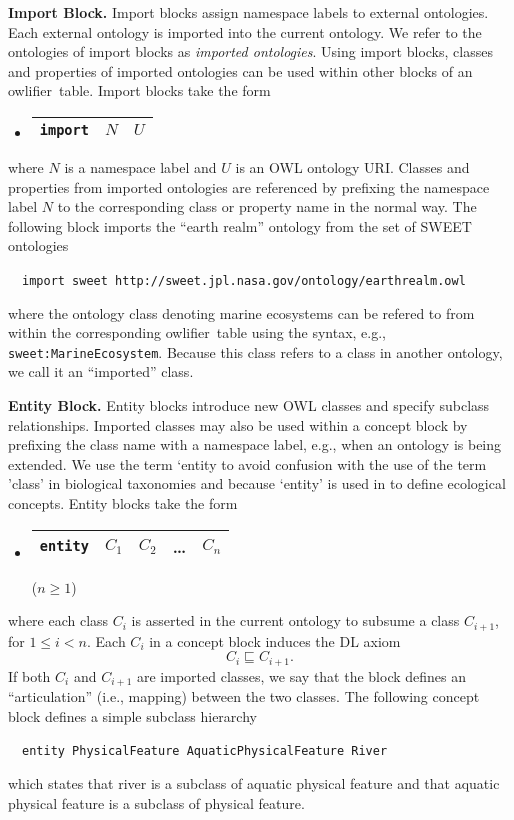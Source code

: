 \documentclass[preprint,number]{elsarticle}
\newcommand{\owlifier}{\textsf{owlifier}}
\newcommand{\mypara}[1]{\vspace{12pt}\noindent\textbf{#1}}
\begin{document}
\mypara{Import Block.} Import blocks assign namespace labels to
external ontologies. Each external ontology is imported into the
current ontology. We refer to the ontologies of import blocks as
\emph{imported ontologies}.  Using import blocks, classes and
properties of imported ontologies can be used within other blocks of
an \owlifier\ table.  Import blocks take the form
\begin{itemize}
\item[]
  \begin{tabular}{|l|l|l|}\hline
    \texttt{import} & $\textit{N}$ & $\textit{U}$ \\ \hline 
  \end{tabular} 
\end{itemize}
where $\textit{N}$ is a namespace label and $\textit{U}$ is an OWL
ontology URI. Classes and properties from imported ontologies are
referenced by prefixing the namespace label $\textit{N}$ to the
corresponding class or property name in the normal way. The following
block imports the ``earth realm'' ontology from the set of SWEET
ontologies \cite{raskin:_seman_web_for_earth_and}
\begin{tabbing}
  ~~\texttt{import sweet
    http://sweet.jpl.nasa.gov/ontology/earthrealm.owl}
\end{tabbing}
where the ontology class denoting marine ecosystems can be refered to
from within the corresponding \owlifier\ table using the syntax, e.g.,
\sloppy\texttt{sweet:MarineEcosystem}. Because this class refers to a
class in another ontology, we call it an ``imported'' class.

\mypara{Entity Block.} Entity blocks introduce new OWL classes and
specify subclass relationships. Imported classes may also be used
within a concept block by prefixing the class name with a namespace
label, e.g., when an ontology is being extended.  We use the term
`entity to avoid confusion with the use of the term 'class' in
biological taxonomies and because `entity' is used in \cite{oboe} to
define ecological concepts. Entity blocks take the form
\begin{itemize}
\item[] 
  \begin{tabular}{|l|l|l|l|l|}\hline
    \texttt{entity} & $C_1$ & $C_2$ & \dots & $C_n$ \\ \hline 
  \end{tabular} \hfill ($n \ge 1$)
\end{itemize}
where each class $C_i$ is asserted in the current ontology to subsume
a class $C_{i+1}$, for $1 \le i < n$. Each $C_i$ in a concept block
induces the DL axiom \[C_i \sqsubseteq C_{i+1}.\] If both $C_i$ and
$C_{i+1}$ are imported classes, we say that the block defines an
``articulation'' (i.e., mapping) between the two classes. The
following concept block defines a simple subclass hierarchy
\begin{tabbing}
  ~~\texttt{entity PhysicalFeature AquaticPhysicalFeature River}
\end{tabbing}
which states that river is a subclass of aquatic physical feature and
that aquatic physical feature is a subclass of physical feature.
\end{document}
